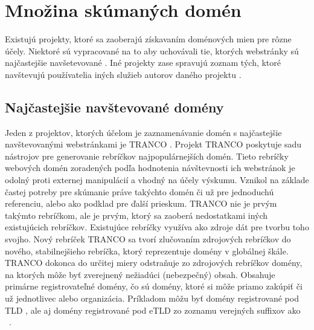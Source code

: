 \pagebreak

\section{Množina skúmaných domén}
\label{tranco}

Existujú projekty, ktoré sa zaoberajú získavaním doménových mien pre rôzne účely.
Niektoré sú vypracované na to aby uchovávali tie, ktorých webstránky sú najčastejšie navšetevované \cite{hacker-target-website-lists-overview, tranco}.
Iné projekty zase spravujú zoznam tých, ktoré navštevujú používatelia iných služieb autorov daného projektu \cite{chrome-crux}. 

\subsection{Najčastejšie navštevované domény}

Jeden z projektov, ktorých účelom je zaznamenávanie domén s najčastejšie navštevovanými webstránkami je TRANCO \cite{tranco}.
Projekt TRANCO poskytuje sadu nástrojov pre generovanie rebríčkov najpopulárnejších domén. 
Tieto rebríčky webových domén zoradených podľa hodnotenia návštevnosti ich webstránok je odolný proti externej manipulácií a vhodný na účely výskumu. 
Vznikol na základe častej potreby pre skúmanie práve takýchto domén či už pre jednoduchú referenciu, alebo ako podklad pre ďalší prieskum.
TRANCO nie je prvým takýmto rebríčkom, ale je prvým, ktorý sa zaoberá nedostatkami iných existujúcich rebríčkov.
Existujúce rebríčky využíva ako zdroje dát pre tvorbu toho svojho.
Nový rebríček TRANCO sa tvorí zlučovaním zdrojových rebríčkov do nového, stabilnejšieho rebríčka, ktorý reprezentuje domény v globálnej škále.
TRANCO dokonca do určitej miery odstraňuje zo zdrojových rebríčkov domény, na ktorých môže byť zverejnený nežiadúci (nebezpečný) obsah.
Obsahuje primárne registrovateľné domény, čo sú domény, ktoré si môže priamo zakúpiť či už jednotlivec alebo organizácia. 
Príkladom môžu byť domény registrované pod TLD , ale aj domény registrované pod eTLD zo zoznamu verejných suffixov ako \mbox{ \cite{tranco}}.

